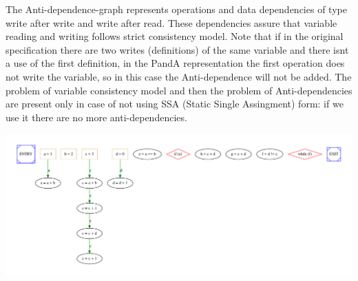 The Anti-\/dependence-\/graph represents operations and data dependencies of type write after write and write after read. These dependencies assure that variable reading and writing follows strict consistency model. Note that if in the original specification there are two writes (definitions) of the same variable and there isn\textquotesingle{}t a use of the first definition, in the PandA representation the first operation does not write the variable, so in this case the Anti-\/dependence will not be added. The problem of variable consistency model and then the problem of Anti-\/dependencies are present only in case of not using S\+SA (Static Single Assingment) form\+: if we use it there are no more anti-\/dependencies. 
\begin{DoxyImageNoCaption}
  \mbox{\includegraphics[width=\textwidth,height=\textheight/2,keepaspectratio=true]{dot_inline_dotgraph_5}}
\end{DoxyImageNoCaption}


